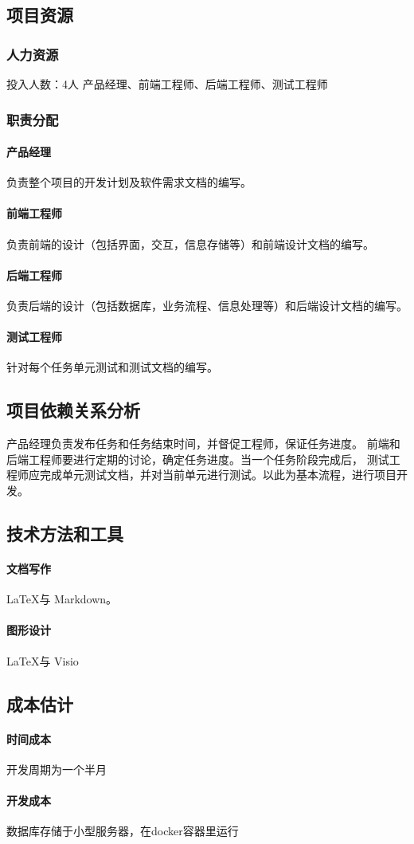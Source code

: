 \documentclass[UTF8]{dingo}
\begin{document}
    \subsection{项目资源}
      \subsubsection{人力资源}
        投入人数：4人
        产品经理、前端工程师、后端工程师、测试工程师
      \subsubsection{职责分配}
        \paragraph{产品经理} 负责整个项目的开发计划及软件需求文档的编写。
        \paragraph{前端工程师} 负责前端的设计（包括界面，交互，信息存储等）和前端设计文档的编写。
        \paragraph{后端工程师} 负责后端的设计（包括数据库，业务流程、信息处理等）和后端设计文档的编写。
        \paragraph{测试工程师} 针对每个任务单元测试和测试文档的编写。
    \subsection{项目依赖关系分析}
      产品经理负责发布任务和任务结束时间，并督促工程师，保证任务进度。
      前端和后端工程师要进行定期的讨论，确定任务进度。当一个任务阶段完成后，
      测试工程师应完成单元测试文档，并对当前单元进行测试。以此为基本流程，进行项目开发。

    \subsection{技术方法和工具}
      \paragraph{文档写作} \LaTeX 与 Markdown。
      \paragraph{图形设计} \LaTeX 与 Visio
    \subsection{成本估计}
      \paragraph{时间成本} 开发周期为一个半月
      \paragraph{开发成本} 数据库存储于小型服务器，在docker容器里运行
\end{document}

